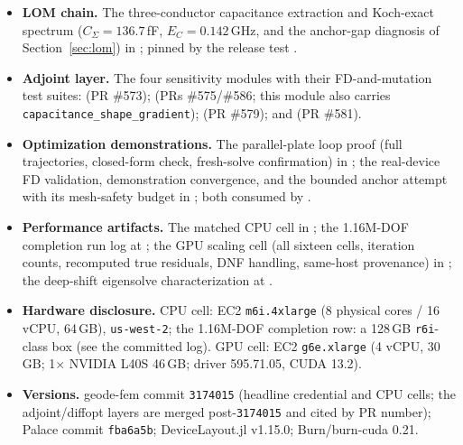 \documentclass{anvil-paper}
\begin{document}
\begin{itemize}
    unless marked as committed.
  \item \textbf{LOM chain.} The three-conductor capacitance extraction
    and Koch-exact spectrum ($C_\Sigma = 136.7$\,fF, $E_C =
    0.142$\,GHz, and the anchor-gap diagnosis of
    Section~\ref{sec:lom}) in
    ; pinned by the
    release test .
  \item \textbf{Adjoint layer.} The four sensitivity modules with their
    FD-and-mutation test suites:
     (PR \#573);
     (PRs \#575/\#586; this module
    also carries \texttt{capacitance\_shape\_gradient});
     (PR \#579); and
     (PR \#581).
  \item \textbf{Optimization demonstrations.} The parallel-plate loop
    proof (full trajectories, closed-form check, fresh-solve
    confirmation) in ;
    the real-device FD validation, demonstration convergence, and the
    bounded anchor attempt with its mesh-safety budget in
    ; both consumed
    by .
  \item \textbf{Performance artifacts.} The matched CPU cell in
    ; the 1.16M-DOF
    completion run log at
    ;
    the GPU scaling cell (all sixteen cells, iteration counts,
    recomputed true residuals, DNF handling, same-host provenance) in
    ; the deep-shift
    eigensolve characterization at
    .
  \item \textbf{Hardware disclosure.} CPU cell: EC2 \texttt{m6i.4xlarge}
    (8 physical cores / 16 vCPU, 64\,GB), \texttt{us-west-2}; the
    1.16M-DOF completion row: a 128\,GB \texttt{r6i}-class box (see the
    committed log). GPU cell: EC2 \texttt{g6e.xlarge} (4 vCPU, 30\,GB;
    1$\times$ NVIDIA L40S 46\,GB; driver 595.71.05, CUDA 13.2).
  \item \textbf{Versions.} geode-fem commit \texttt{3174015} (headline
    credential and CPU cells; the adjoint/diffopt layers are merged
    post-\texttt{3174015} and cited by PR number); Palace commit
    \texttt{fba6a5b}; DeviceLayout.jl v1.15.0; Burn/burn-cuda 0.21.
\end{itemize}
\end{document}
